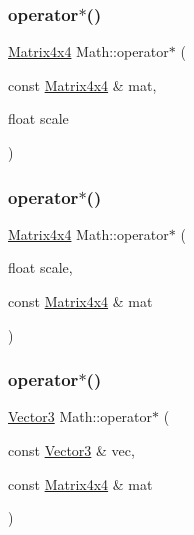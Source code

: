 \mbox{\label{namespace_math_adddddb021bc36b35e73f09ed99fa11c5}} 
\subsubsection{\texorpdfstring{operator$\ast$()}{operator*()}\hspace{0.1cm}{\footnotesize\ttfamily [8/19]}}
{\footnotesize\ttfamily \mbox{\hyperlink{struct_math_1_1_matrix4x4}{Matrix4x4}} Math\+::operator$\ast$ (\begin{DoxyParamCaption}\item[{const \mbox{\hyperlink{struct_math_1_1_matrix4x4}{Matrix4x4}} \&}]{mat,  }\item[{float}]{scale }\end{DoxyParamCaption})}

\mbox{\label{namespace_math_a7239dba8d71c3d6209d9fd502fd1e2ad}} 
\subsubsection{\texorpdfstring{operator$\ast$()}{operator*()}\hspace{0.1cm}{\footnotesize\ttfamily [9/19]}}
{\footnotesize\ttfamily \mbox{\hyperlink{struct_math_1_1_matrix4x4}{Matrix4x4}} Math\+::operator$\ast$ (\begin{DoxyParamCaption}\item[{float}]{scale,  }\item[{const \mbox{\hyperlink{struct_math_1_1_matrix4x4}{Matrix4x4}} \&}]{mat }\end{DoxyParamCaption})}

\mbox{\label{namespace_math_aa7973248d0183ea280fef5097eb6ef3f}} 
\subsubsection{\texorpdfstring{operator$\ast$()}{operator*()}\hspace{0.1cm}{\footnotesize\ttfamily [10/19]}}
{\footnotesize\ttfamily \mbox{\hyperlink{struct_math_1_1_vector3}{Vector3}} Math\+::operator$\ast$ (\begin{DoxyParamCaption}\item[{const \mbox{\hyperlink{struct_math_1_1_vector3}{Vector3}} \&}]{vec,  }\item[{const \mbox{\hyperlink{struct_math_1_1_matrix4x4}{Matrix4x4}} \&}]{mat }\end{DoxyParamCaption})}

